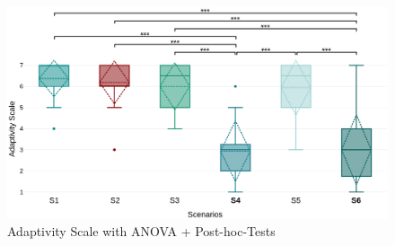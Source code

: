 \begin{figure}
    \centering
    \includegraphics[width=\linewidth]{images/Chapter5/adaptivity_scale.png}
    \caption{Adaptivity Scale with ANOVA + Post-hoc-Tests}
    \label{fig:adaptivity_scale_anova}
\end{figure}



